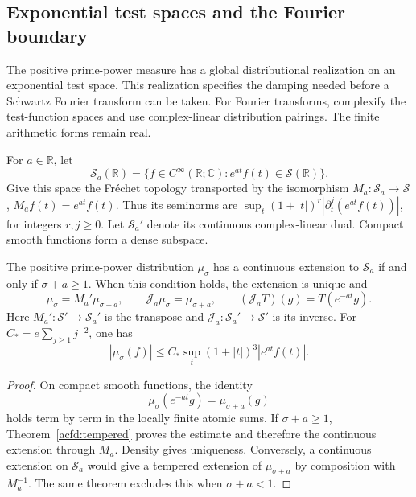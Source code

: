 \subsection{Exponential test spaces and the Fourier boundary}
\label{acfd:global-domain}

The positive prime-power measure has a global distributional realization
on an exponential test space.  This realization specifies the damping
needed before a Schwartz Fourier transform can be taken.
For Fourier transforms, complexify the test-function spaces and use complex-linear
distribution pairings.  The finite arithmetic forms remain real.

For $a\in\mathbb R$, let
\[
 \mathcal S_a(\mathbb R)=
 \{f\in C^\infty(\mathbb R;\mathbb C):e^{at}f(t)\in\mathcal S(\mathbb R)\}.
\]
Give this space the Fr\'echet topology transported by the isomorphism
$M_a:\mathcal S_a\to\mathcal S$, $M_af(t)=e^{at}f(t)$.
Thus its seminorms are
$\sup_t(1+|t|)^r|\partial_t^j(e^{at}f(t))|$, for integers $r,j\geq0$.
Let $\mathcal S_a'$ denote its continuous complex-linear dual.
Compact smooth functions form a dense subspace.

\begin{theorem}\label{acfd:exponential-domain}
The positive prime-power distribution $\mu_\sigma$ has a continuous
extension to $\mathcal S_a$ if and only if $\sigma+a\geq1$.
When this condition holds, the extension is unique and
\begin{equation}\label{acfd:typed-damping}
 \mu_\sigma=M_a'\mu_{\sigma+a},\qquad
 \mathcal J_a\mu_\sigma=\mu_{\sigma+a},\qquad
 (\mathcal J_a T)(g)=T(e^{-at}g).
\end{equation}
Here $M_a':\mathcal S'\to\mathcal S_a'$ is the transpose and
$\mathcal J_a:\mathcal S_a'\to\mathcal S'$ is its inverse.
For $C_*=e\sum_{j\geq1}j^{-2}$, one has
\[
 |\mu_\sigma(f)|\leq
 C_*\sup_t(1+|t|)^3|e^{at}f(t)|.
\]
\end{theorem}

\begin{proof}
On compact smooth functions, the identity
\[
 \mu_\sigma(e^{-at}g)=\mu_{\sigma+a}(g)
\]
holds term by term in the locally finite atomic sums.
If $\sigma+a\geq1$, Theorem~\ref{acfd:tempered} proves the estimate and
therefore the continuous extension through $M_a$.
Density gives uniqueness.
Conversely, a continuous extension on $\mathcal S_a$ would give a tempered
extension of $\mu_{\sigma+a}$ by composition with $M_a^{-1}$.
The same theorem excludes this when $\sigma+a<1$.
\end{proof}

